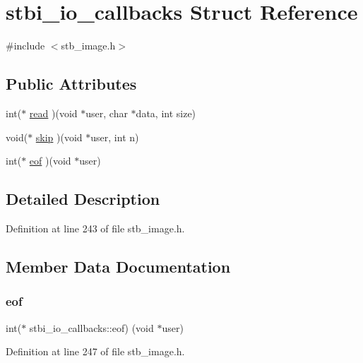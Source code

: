 \hypertarget{structstbi__io__callbacks}{}\section{stbi\+\_\+io\+\_\+callbacks Struct Reference}
\label{structstbi__io__callbacks}


{\ttfamily \#include $<$stb\+\_\+image.\+h$>$}

\subsection*{Public Attributes}
\begin{DoxyCompactItemize}
\item 
int($\ast$ \hyperlink{structstbi__io__callbacks_a623e46b3a2a019611601409926283a88}{read} )(void $\ast$user, char $\ast$data, int size)
\item 
void($\ast$ \hyperlink{structstbi__io__callbacks_a257aac5480a90a6c4b8fbe86c1b01068}{skip} )(void $\ast$user, int n)
\item 
int($\ast$ \hyperlink{structstbi__io__callbacks_a319639db2f76e715eed7a7a974136832}{eof} )(void $\ast$user)
\end{DoxyCompactItemize}


\subsection{Detailed Description}


Definition at line 243 of file stb\+\_\+image.\+h.



\subsection{Member Data Documentation}
\mbox{\label{structstbi__io__callbacks_a319639db2f76e715eed7a7a974136832}} 
\subsubsection{\texorpdfstring{eof}{eof}}
{\footnotesize\ttfamily int($\ast$ stbi\+\_\+io\+\_\+callbacks\+::eof) (void $\ast$user)}



Definition at line 247 of file stb\+\_\+image.\+h.

